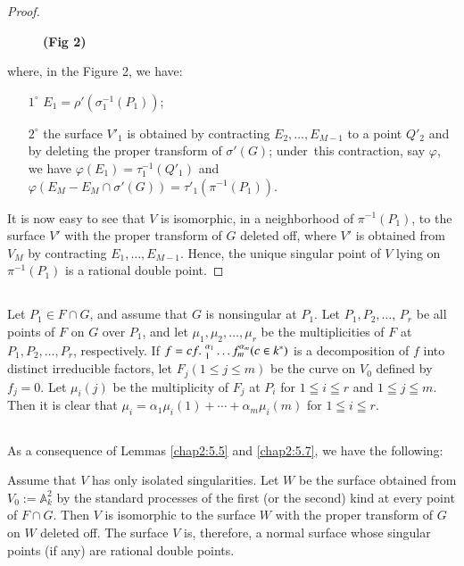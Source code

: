 \begin{proof}
\begin{figure}[H]
\medskip
{\bf (Fig 2)}
\end{figure}
\noindent
where, in the Figure 2, we have:
\begin{itemize}
\item[$1^{\circ}$] $E_{1}=\rho'(\sigma^{-1}_{1}(P_{1}))$;

\item[$2^{\circ}$] the surface $V'_{1}$ is obtained by contracting
  $E_{2},\ldots,E_{M-1}$ to a point $Q'_{2}$ and by deleting the
  proper transform of $\sigma'(G)$; under\pageoriginale\ this
  contraction, say $\varphi$, we have
  $\varphi(E_{1})=\tau^{-1}_{1}(Q'_{1})$ and $\varphi(E_{M}-E_{M}\cap
  \sigma'(G))=\tau'_{1}(\pi^{-1}(P_{1}))$. 
\end{itemize}

It is now easy to see that $V$ is isomorphic, in a neighborhood of
$\pi^{-1}(P_{1})$, to the surface $V'$ with the proper transform of
$G$ deleted off, where $V'$ is obtained from $V_{M}$ by contracting
$E_{1},\ldots,E_{M-1}$. Hence, the unique singular point of $V$ lying
on $\pi^{-1}(P_{1})$ is a rational double point.
\end{proof}

\subsection{}\label{chap2:5.8}

Let $P_{1}\in F\cap G$, and assume that $G$ is nonsingular at
$P_{1}$. Let $P_{1},P_{2},\ldots$, $P_{r}$ be all points of $F$ on $G$
over $P_{1}$, and let $\mu_{1},\mu_{2},\ldots,\mu_{r}$ be the
multiplicities of $F$ at $P_{1},P_{2},\ldots,P_{r}$, respectively. If
$f={cf.}\kern.3em^{\alpha_{1}}_{1}\ldots f^{\alpha_{m}}_{m}(c\in k^{\ast})$ is a
decomposition of $f$ into distinct irreducible factors, let
$F_{j}(1\leq j\leq m)$ be the curve on $V_{0}$ defined by
$f_{j}=0$. Let $\mu_{i}(j)$ be the multiplicity of $F_{j}$ at $P_{i}$
for $1\leqq i\leqq r$ and $1\leqq j\leqq m$. Then it is clear that
$\mu_{i}=\alpha_{1}\mu_{i}(1)+\cdots+\alpha_{m}\mu_{i}(m)$ for $1\leqq
i\leqq r$.

\subsection{}\label{chap2:5.9}

As a consequence of Lemmas \ref{chap2:5.5} and \ref{chap2:5.7}, we have the
following: 

\begin{theorem*}
Assume that $V$ has only isolated singularities. Let $W$ be the
surface obtained from $V_{0}:=\mathbb{A}^{2}_{k}$ by the standard
processes of the first (or the second) kind at every point of $F\cap
G$. Then $V$ is isomorphic to the surface $W$ with the proper
transform of $G$ on $W$ deleted off. The surface $V$ is, therefore, a
normal surface whose singular points (if any) are rational double
points.
\end{theorem*}

